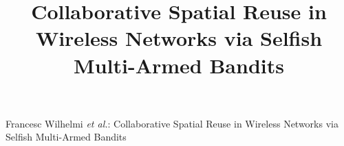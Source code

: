 \documentclass[10pt,journal,compsoc]{IEEEtran}
\begin{document}
	
	\title{Collaborative Spatial Reuse in Wireless Networks via Selfish Multi-Armed Bandits}

	\author{}
	
	
	\markboth{}%
	{Francesc Wilhelmi \MakeLowercase{\textit{et al.}}: Collaborative Spatial Reuse in Wireless Networks via Selfish Multi-Armed Bandits}
	
\end{document}
